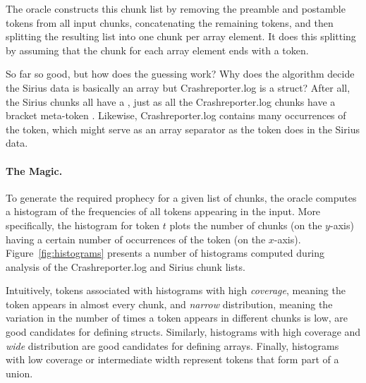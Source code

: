 \noindent
The oracle constructs this chunk list by removing the preamble and
postamble tokens from all input chunks, concatenating the
remaining tokens, and then splitting the resulting list into one chunk
per array element. It does this splitting by assuming that the chunk
for each array element ends with a  token.  

So far so good, but how does the guessing work?  Why does the
algorithm decide the Sirius data is basically an array but 
Crashreporter.log is a struct? After all, the Sirius chunks all have
a , just as all the Crashreporter.log chunks have a bracket
meta-token \cd{[*]}. Likewise, Crashreporter.log contains many occurrences of
the  token, which might serve as
an array separator as the  token does in the Sirius data.



\paragraph*{The Magic.}
To generate the required prophecy for a given list of chunks, the
oracle computes a histogram of the frequencies of all tokens appearing
in the input.  
More specifically, the histogram for token $t$
plots the number of chunks (on the $y$-axis)
having a certain number of occurrences of the token (on the $x$-axis). 
Figure~\ref{fig:histograms} presents a number of histograms computed
during analysis of the Crashreporter.log and Sirius chunk lists.

Intuitively, tokens associated 
with histograms with high {\em coverage}, meaning the token appears
in almost every chunk, and {\em narrow} distribution, meaning the variation in
the number of times a token appears in different chunks is low, are
good candidates for defining structs.  Similarly, histograms with
high coverage and {\em wide} distribution are good candidates for defining
arrays.  Finally, histograms with low coverage or intermediate width
represent tokens that form part of a union.  


